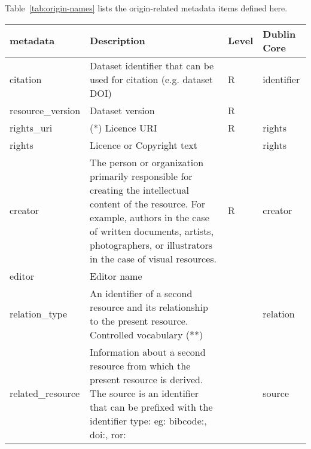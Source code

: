 \documentclass[11pt,a4paper]{ivoa}
\begin{document}
Table~\ref{tab:origin-names} lists the origin-related metadata items
defined here.

\begin{table}
\begin{tabular}{|l|p{5cm}|l|l|}  \hline
\textbf{metadata} & \textbf{Description} & \textbf{Level} & \textbf{Dublin Core}\\ \hline
citation    & Dataset identifier that can be used for citation (e.g. dataset DOI) & R  & identifier\\ \hline
resource\_version  & Dataset version  & R & \\ \hline
rights\_uri        & (*) Licence URI & R & rights\\ \hline
rights             & Licence or Copyright text &  & rights\\ \hline
creator            & The person or organization primarily responsible for creating the
                     intellectual content of the resource.  For example, authors in the
                     case of written documents, artists, photographers, or illustrators in
                     the case of visual resources. & R & creator\\ \hline
editor             & Editor name &  & \\ \hline
relation\_type     & An identifier of a second resource and its relationship to the
                     present resource.
                     Controlled vocabulary (**)& & relation\\ \hline
related\_resource  & Information about a second resource from which the present resource
                     is derived. The source is an identifier that can be prefixed with the identifier type: eg: bibcode:, doi:, ror: &  & source\\ \hline

\end{tabular}
\end{table}
\end{document}
